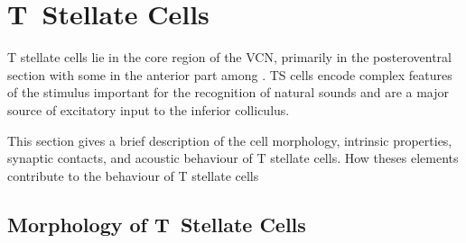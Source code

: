 \section{T~Stellate Cells}\label{sec:t-stellate-cells}

T stellate cells lie in the core region of the VCN, primarily in the posteroventral section with some in the anterior part among \citep{Osen:1969,Lorente:1981,BrawerMorestEtAl:1974,OertelWuEtAl:1990,DoucetRyugo:2006,DoucetRyugo:1997}.
TS cells encode complex features of the stimulus important for the recognition of natural sounds and are a major source of excitatory input to the inferior colliculus.


This section gives a brief description of the cell morphology, intrinsic properties, synaptic contacts, and acoustic behaviour of T stellate cells. How theses elements contribute to the behaviour of T stellate cells 

\subsection{Morphology of T~Stellate Cells}\label{sec:morph-t-stell}


